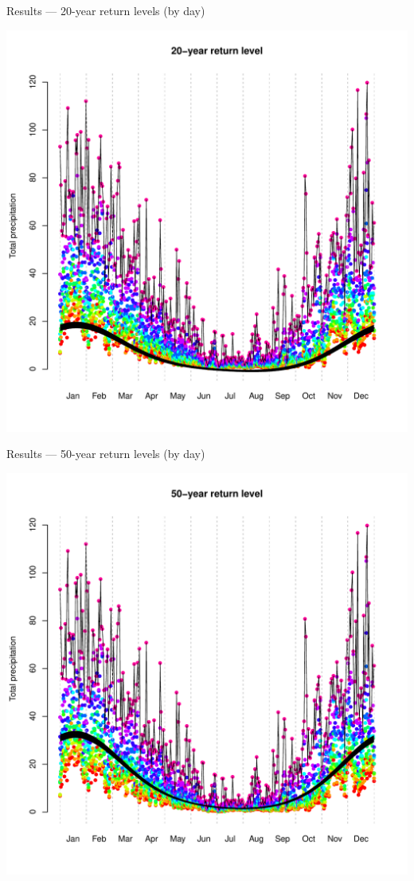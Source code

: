 \documentclass[mathserif, 11pt, t]{beamer}
\begin{document}
\begin{frame}{Results --- 20-year return levels (by day)}
\begin{center}
\includegraphics[scale=0.30]{../figs/return20.pdf}
\end{center}
\end{frame}

\begin{frame}{Results --- 50-year return levels (by day)}
\begin{center}
\includegraphics[scale=0.30]{../figs/return50.pdf}
\end{center}
\end{frame}
\end{document}
